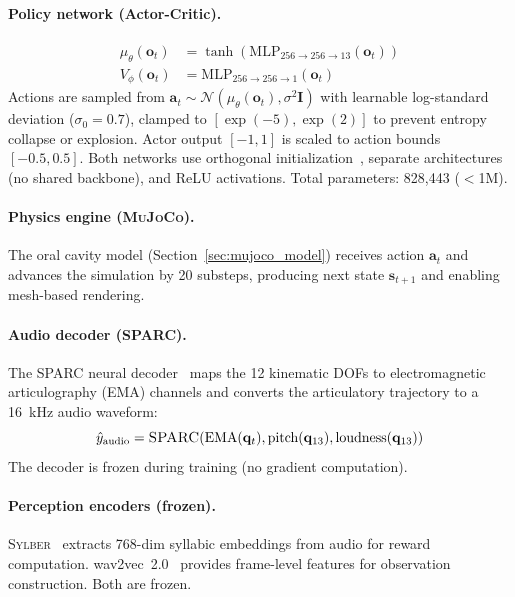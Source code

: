 \documentclass[11pt, a4paper]{article}
\newcommand{\sparc}{\textsc{SPARC}}
\newcommand{\sylber}{\textsc{Sylber}}
\newcommand{\mujoco}{\textsc{MuJoCo}}
\begin{document}
\paragraph{Policy network (Actor-Critic).}
\begin{align}
    \mu_\theta(\mathbf{o}_t) &= \tanh(\text{MLP}_{256 \to 256 \to 13}(\mathbf{o}_t)) \label{eq:actor} \\
    V_\phi(\mathbf{o}_t) &= \text{MLP}_{256 \to 256 \to 1}(\mathbf{o}_t) \label{eq:critic}
\end{align}
Actions are sampled from $\mathbf{a}_t \sim \mathcal{N}(\mu_\theta(\mathbf{o}_t), \sigma^2 \mathbf{I})$ with learnable log-standard deviation ($\sigma_0 = 0.7$), clamped to $[\exp(-5), \exp(2)]$ to prevent entropy collapse or explosion. Actor output $[-1,1]$ is scaled to action bounds $[-0.5, 0.5]$. Both networks use orthogonal initialization~\cite{schulman2017ppo}, separate architectures (no shared backbone), and ReLU activations. Total parameters: 828,443 ($<$1M).

\paragraph{Physics engine (\mujoco{}).}
The oral cavity model (Section~\ref{sec:mujoco_model}) receives action $\mathbf{a}_t$ and advances the simulation by 20 substeps, producing next state $\mathbf{s}_{t+1}$ and enabling mesh-based rendering.

\paragraph{Audio decoder (\sparc{}).}
The \sparc{} neural decoder~\cite{parrot2024sparc} maps the 12 kinematic DOFs to electromagnetic articulography (EMA) channels and converts the articulatory trajectory to a 16~kHz audio waveform:
\begin{equation}
    \hat{y}_{\text{audio}} = \sparc{}(\text{EMA}(\mathbf{q}_t), \text{pitch}(\mathbf{q}_{13}), \text{loudness}(\mathbf{q}_{13}))
\end{equation}
The decoder is frozen during training (no gradient computation).

\paragraph{Perception encoders (frozen).}
\sylber{}~\cite{cho2024sylber} extracts 768-dim syllabic embeddings from audio for reward computation. wav2vec~2.0~\cite{baevski2020wav2vec} provides frame-level features for observation construction. Both are frozen.
\end{document}
